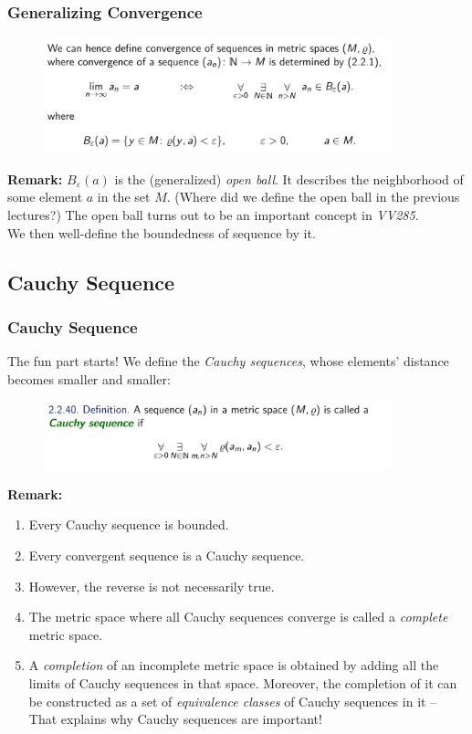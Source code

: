 \documentclass[10pt, t]{beamer}
\renewcommand{\emph}[1]{{\color{themecolor}\textsl{#1}}}
\newcommand{\nullspace}{~\\[15pt]}
\begin{document}
\begin{frame}
    \frametitle{Generalizing Convergence}

    \begin{figure}[H]
        \centering
        \includegraphics[width=0.9\textwidth]{2020-10-13-19-33-25.png}
    \end{figure}
    \textbf{Remark:} $B_\varepsilon(a)$ is the (generalized) \emph{open ball}. It describes the neighborhood of some element $a$ in the set $M$. (Where did we define the open ball in the previous lectures?) The open ball turns out to be an important concept in \textit{VV285}.
    \nullspace
    We then well-define the boundedness of sequence by it.
\end{frame}

\subsection{Cauchy Sequence}
\begin{frame}
    \frametitle{Cauchy Sequence}

    The fun part starts! We define the \emph{Cauchy sequences}, whose elements' distance becomes smaller and smaller:
    \begin{figure}[H]
        \centering
        \includegraphics[width=0.9\textwidth]{2020-10-13-19-57-33.png}
    \end{figure}

    \textbf{Remark:}
    \begin{enumerate}
        \item Every Cauchy sequence is bounded.
        \item Every convergent sequence is a Cauchy sequence.
        \item However, the reverse is not necessarily true.
        \item The metric space where all Cauchy sequences converge is called a \emph{complete} metric space.
        \item A \emph{completion} of an incomplete metric space is obtained by adding all the limits of Cauchy sequences in that space. Moreover, the completion of it can be constructed as a set of \emph{equivalence classes} of Cauchy sequences in it -- That explains why Cauchy sequences are important!
    \end{enumerate}
\end{frame}
\end{document}

